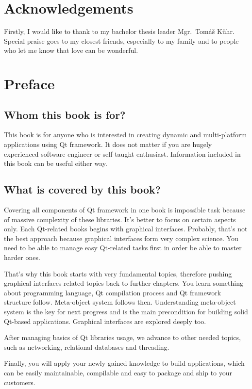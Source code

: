\section*{Acknowledgements}
Firstly, I would like to thank to my bachelor thesis leader Mgr.~Tomáš Kühr. Special praise goes to my closest friends, especially to my family and to people who let me know that love can be wonderful.

\clearpage

\section*{Preface}

\subsection*{Whom this book is for?}
This book is for anyone who is interested in creating dynamic and multi-platform applications using Qt framework. It does not matter if you are hugely experienced software engineer or self-taught enthusiast. Information included in this book can be useful either way.

\subsection*{What is covered by this book?}
Covering all components of Qt framework in one book is impossible task because of massive complexity of these libraries. It's better to focus on certain aspects only. Each Qt-related books begins with graphical interfaces. Probably, that's not the best approach because graphical interfaces form very complex science. You need to be able to manage easy Qt-related tasks first in order be able to master harder ones.

That's why this book starts with very fundamental topics, therefore pushing graphical-interfaces-related topics back to further chapters. You learn something about \cpp programming language, Qt compilation process and Qt framework structure follow. Meta-object system follows then. Understanding meta-object system is the key for next progress and is the main precondition for building solid Qt-based applications. Graphical interfaces are explored deeply too.

After managing basics of Qt libraries usage, we advance to other needed topics, such as networking, relational databases and threading.

Finally, you will apply your newly gained knowledge to build applications, which can be easily maintainable, compilable and easy to package and ship to your customers.

